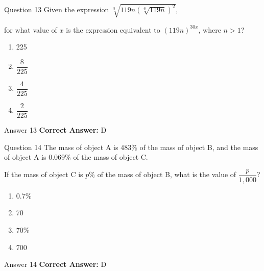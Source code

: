 \documentclass{beamer}
\begin{document}
\begin{frame}{Question 13}
\small
Given the expression \(\sqrt[5]{119n \left(\sqrt[6]{119n}\right)^2}\),

for what value of \(x\) is the expression equivalent to \((119n)^{30x}\), where \(n > 1\)?
\vspace{0.35cm}
\begin{enumerate}
    \item[A.] 225
    \item[B.] \(\dfrac{8}{225}\)
    \item[C.] \(\dfrac{4}{225}\)
    \item[D.] \(\dfrac{2}{225}\)
\end{enumerate}
\end{frame}
\begin{frame}{Answer 13}
\small
\textbf{Correct Answer:} D
\end{frame}

\begin{frame}{Question 14}
\small
The mass of object A is 483\% of the mass of object B, and the mass of object A is 0.069\% of the mass of object C.

If the mass of object C is \(p\%\) of the mass of object B, what is the value of \(\dfrac{p}{1,\!000}\)?
\vspace{0.35cm}
\begin{enumerate}
    \item[A.] 0.7\%
    \item[B.] 70
    \item[C.] 70\%
    \item[D.] 700
\end{enumerate}
\end{frame}
\begin{frame}{Answer 14}
\small
\textbf{Correct Answer:} D
\end{frame}
\end{document}
